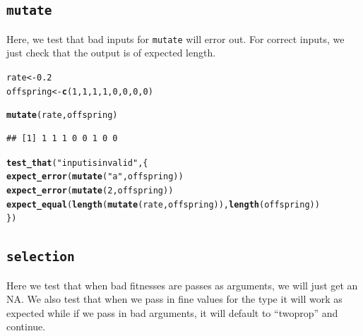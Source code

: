 \documentclass{article}\usepackage[]{graphicx}\usepackage[]{color}
\makeatletter
\newcommand{\hlnum}[1]{\textcolor[rgb]{0.686,0.059,0.569}{#1}}%
\newcommand{\hlstr}[1]{\textcolor[rgb]{0.192,0.494,0.8}{#1}}%
\newcommand{\hlstd}[1]{\textcolor[rgb]{0.345,0.345,0.345}{#1}}%
\newcommand{\hlkwb}[1]{\textcolor[rgb]{0.69,0.353,0.396}{#1}}%
\newcommand{\hlkwd}[1]{\textcolor[rgb]{0.737,0.353,0.396}{\textbf{#1}}}%
\newenvironment{kframe}{%
 \def\at@end@of@kframe{}%
 \ifinner\ifhmode%
  \def\at@end@of@kframe{\end{minipage}}%
  \begin{minipage}{\columnwidth}%
 \fi\fi%
 \def\FrameCommand##1{\hskip\@totalleftmargin \hskip-\fboxsep
 \colorbox{shadecolor}{##1}\hskip-\fboxsep
     \hskip-\linewidth \hskip-\@totalleftmargin \hskip\columnwidth}%
 \MakeFramed {\advance\hsize-\width
   \@totalleftmargin\z@ \linewidth\hsize
   \@setminipage}}%
 {\par\unskip\endMakeFramed%
 \at@end@of@kframe}
\newenvironment{knitrout}{}{} %
\makeatother
\begin{document}
\subsection{\texttt{mutate}}
Here, we test that bad inputs for \texttt{mutate} will error out. For correct inputs, we just check that the output is of expected length.

\begin{knitrout}
\color{fgcolor}\begin{kframe}
\begin{alltt}
\hlstd{rate}\hlkwb{<-}\hlnum{0.2}
\hlstd{offspring}\hlkwb{<-}\hlkwd{c}\hlstd{(}\hlnum{1}\hlstd{,}\hlnum{1}\hlstd{,}\hlnum{1}\hlstd{,}\hlnum{1}\hlstd{,}\hlnum{0}\hlstd{,}\hlnum{0}\hlstd{,}\hlnum{0}\hlstd{,}\hlnum{0}\hlstd{)}

\hlkwd{mutate}\hlstd{(rate, offspring)}
\end{alltt}
\begin{verbatim}
## [1] 1 1 1 0 0 1 0 0
\end{verbatim}
\begin{alltt}
\hlkwd{test_that}\hlstd{(}\hlstr{"input is invalid"}\hlstd{,\{}
  \hlkwd{expect_error}\hlstd{(}\hlkwd{mutate}\hlstd{(}\hlstr{"a"}\hlstd{, offspring))}
  \hlkwd{expect_error}\hlstd{(}\hlkwd{mutate}\hlstd{(}\hlnum{2}\hlstd{, offspring))}
  \hlkwd{expect_equal}\hlstd{(}\hlkwd{length}\hlstd{(}\hlkwd{mutate}\hlstd{(rate, offspring)),} \hlkwd{length}\hlstd{(offspring))}
\hlstd{\})}
\end{alltt}
\end{kframe}
\end{knitrout}

\subsection{\texttt{selection}}
Here we test that when bad fitnesses are passes as arguments, we will just get an NA. We also test that when we pass in fine values for the type it will work as expected while if we pass in bad arguments, it will default to ``twoprop'' and continue.
\end{document}
